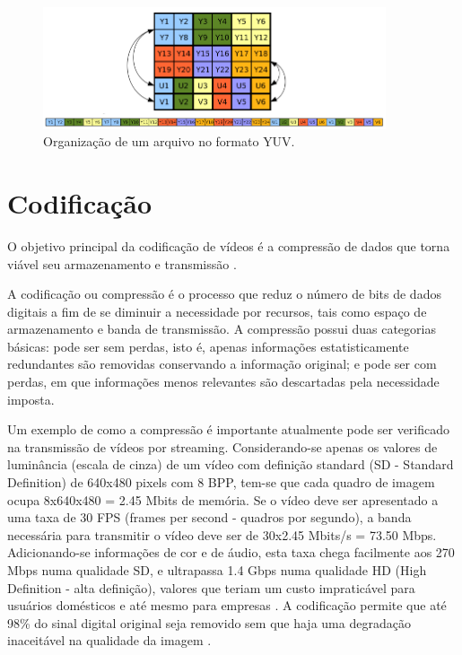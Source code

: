 \begin{figure}[!htb]
	\centering
	\includegraphics[width=0.9\textwidth]{./imgs/yuvorganization.png}
	\caption{Organização de um arquivo no formato YUV.}
	\label{fig:yuvorganization}
\end{figure}

\section{Codificação}

O objetivo principal da codificação de vídeos é a compressão de dados que torna viável seu armazenamento e transmissão \cite{daronco}.

A codificação ou compressão é o processo que reduz o número de bits de dados digitais a fim de se diminuir a necessidade por recursos, tais como espaço de armazenamento e banda de transmissão. A compressão possui duas categorias básicas: pode ser sem perdas, isto é, apenas informações estatisticamente redundantes são removidas conservando a informação original; e pode ser com perdas, em que informações menos relevantes são descartadas pela necessidade imposta.

Um exemplo de como a compressão é importante atualmente pode ser verificado na transmissão de vídeos por streaming. Considerando-se apenas os valores de luminância (escala de cinza) de um vídeo com definição standard (SD - Standard Definition) de 640x480 pixels com 8 BPP, tem-se que cada quadro de imagem ocupa 8x640x480 = 2.45 Mbits de memória. Se o vídeo deve ser apresentado a uma taxa de 30 FPS (frames per second - quadros por segundo), a banda necessária para transmitir o vídeo deve ser de 30x2.45 Mbits/s = 73.50 Mbps. Adicionando-se informações de cor e de áudio, esta taxa chega facilmente aos 270 Mbps numa qualidade SD, e ultrapassa 1.4 Gbps numa qualidade HD (High Definition - alta definição), valores que teriam um custo impraticável para usuários domésticos e até mesmo para empresas \cite{ciscoieee}. A codificação permite que até 98\% do sinal digital original seja removido sem que haja uma degradação inaceitável na qualidade da imagem \cite{mpeg2ref}.


